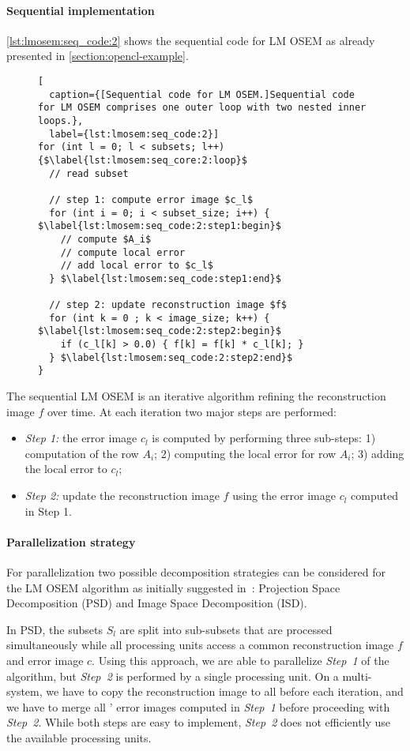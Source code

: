 \paragraph{Sequential implementation}
\autoref{lst:lmosem:seq_code:2} shows the sequential code for LM OSEM as already presented in \autoref{section:opencl-example}.
%
\begin{figure}
\begin{lstlisting}[
  caption={[Sequential code for LM OSEM.]Sequential code for LM OSEM comprises one outer loop with two nested inner loops.},
  label={lst:lmosem:seq_code:2}]
for (int l = 0; l < subsets; l++) {$\label{lst:lmosem:seq_core:2:loop}$
  // read subset

  // step 1: compute error image $c_l$
  for (int i = 0; i < subset_size; i++) { $\label{lst:lmosem:seq_code:2:step1:begin}$
    // compute $A_i$
    // compute local error
    // add local error to $c_l$
  } $\label{lst:lmosem:seq_code:step1:end}$

  // step 2: update reconstruction image $f$
  for (int k = 0 ; k < image_size; k++) { $\label{lst:lmosem:seq_code:2:step2:begin}$
    if (c_l[k] > 0.0) { f[k] = f[k] * c_l[k]; }
  } $\label{lst:lmosem:seq_code:2:step2:end}$
}
\end{lstlisting}
\end{figure}
%
The sequential LM OSEM is an iterative algorithm refining the reconstruction image $f$ over time.
At each iteration two major steps are performed:
\begin{itemize}
  \item[] \emph{Step 1:} the error image $c_l$ is computed by performing three sub-steps: 1) computation of the row $A_i$; 2) computing the local error for row $A_i$; 3) adding the local error to $c_l$;
  \item[] \emph{Step 2:} update the reconstruction image $f$ using the error image $c_l$ computed in Step 1.
\end{itemize}

\paragraph{Parallelization strategy}
For parallelization two possible decomposition strategies can be considered for the LM OSEM algorithm as initially suggested in~\cite{JonesJoKeNeReLeByBaMiCa2002}: Projection Space Decomposition (PSD) and Image Space Decomposition (ISD).

In PSD, the subsets $S_l$ are split into sub-subsets that are processed simultaneously while all processing units access a common reconstruction image $f$ and error image $c$.
Using this approach, we are able to parallelize \emph{Step~1} of the algorithm, but \emph{Step~2} is performed by a single processing unit.
On a multi-\GPU system, we have to copy the reconstruction image to all \GPUs before each iteration, and we have to merge all \GPUs' error images computed in \emph{Step~1} before proceeding with \emph{Step~2}.
While both steps are easy to implement, \emph{Step~2} does not efficiently use the available processing units.

